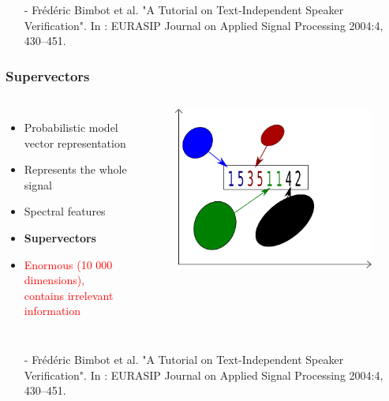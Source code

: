 \documentclass[11pt,english]{beamer}
\begin{document}
\begin{frame}
\begin{itemize}
\item[-]  Frédéric Bimbot et al. "A Tutorial on Text-Independent Speaker Verification".  In : EURASIP Journal on Applied Signal Processing 2004:4, 430–451.

  \end{itemize}
\end{frame}

\begin{frame}
 \frametitle{Supervectors}
  \begin{columns}
    \begin{itemize}
    \item Probabilistic model vector representation
    \item Represents the whole signal
    \item Spectral features
    \item \textbf{Supervectors}
    \item \textcolor{red}{Enormous (10 000 dimensions), contains irrelevant information}
    \end{itemize}
    \begin{figure}
        \centering
       \includegraphics[scale = 0.5]{supervectors.pdf}
      \end{figure}
  \end{columns}
  \begin{itemize}
  
\item[-]  Frédéric Bimbot et al. "A Tutorial on Text-Independent Speaker Verification".  In : EURASIP Journal on Applied Signal Processing 2004:4, 430–451.

  \end{itemize}

\end{frame}
\end{document}
